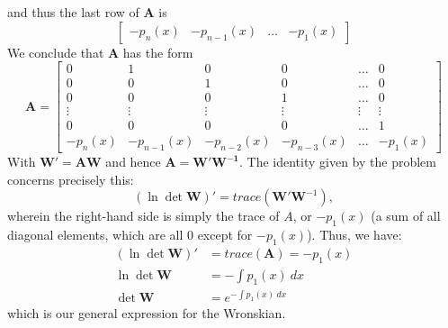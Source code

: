 \documentclass{article}
\begin{document}
and thus the last row of $\mathbf{A}$ is
\begin{equation*}
    \begin{bmatrix}
        -p_n(x) & -p_{n-1}(x) &\dots &-p_1(x)
    \end{bmatrix}
\end{equation*}
We conclude that $\mathbf{A}$ has the form
\begin{equation*}
    \mathbf{A} =
    \begin{bmatrix}
        0 & 1 & 0 & 0 & \dots & 0 \\
        0 & 0 & 1 & 0 & \dots & 0 \\
        0 & 0 & 0 & 1 & \dots & 0 \\
        \vdots & \vdots & \vdots & \vdots & \vdots & \vdots \\
        0 & 0 & 0 & 0 & \dots & 1 \\
        -p_n(x) & -p_{n-1}(x) & -p_{n-2}(x) & -p_{n-3}(x) &\dots &-p_1(x)
    \end{bmatrix}
\end{equation*}
With $\mathbf{W'} = \mathbf{AW}$ and hence $\mathbf{A} = \mathbf{W'W^{-1}}$. The identity given by the problem concerns precisely this:
\begin{equation*}
    (\ln \det \mathbf{W})' = trace(\mathbf{W}' \mathbf{W}^{-1}),
\end{equation*}
wherein the right-hand side is simply the trace of $A$, or $-p_1(x)$ (a sum of all diagonal elements, which are all 0 except for $-p_1(x)$). Thus, we have:
\begin{equation*}
    \begin{aligned}
        (\ln \det \mathbf{W})' &= trace(\mathbf{A}) = -p_1(x) \\
        \ln \det \mathbf{W} &= -\int p_1(x) \ dx \\
        \det \mathbf{W} &= e^{-\int p_1(x) \ dx }
    \end{aligned}
\end{equation*}
which is our general expression for the Wronskian.

\hrulefill
\end{document}
